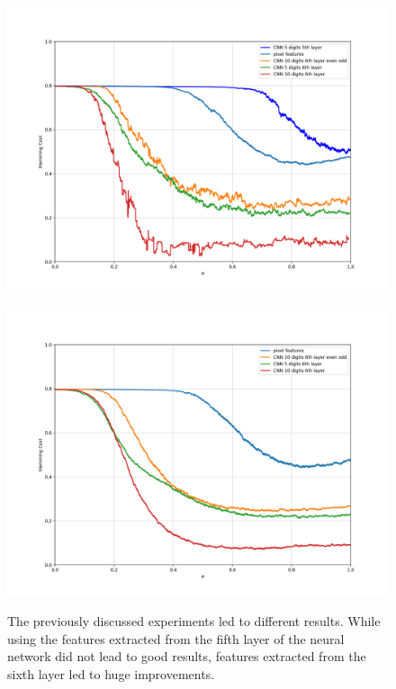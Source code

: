 \begin{figure}[H]
\centering
\begin{minipage}{.45\textwidth}
  \centering
  {\includegraphics[width=\linewidth]{plots/mnist_overview}}
\end{minipage}\quad
\begin{minipage}{.45\textwidth}
  \centering
  {\includegraphics[width=\linewidth]{plots/mnist_overview_random}}
\end{minipage}
\caption{%
  The previously discussed experiments led to different results. While using the features extracted from the fifth layer of the neural network did not lead to good results, features extracted from the sixth layer led to huge improvements.}
\label{fig:mnist_overview}
\end{figure}

